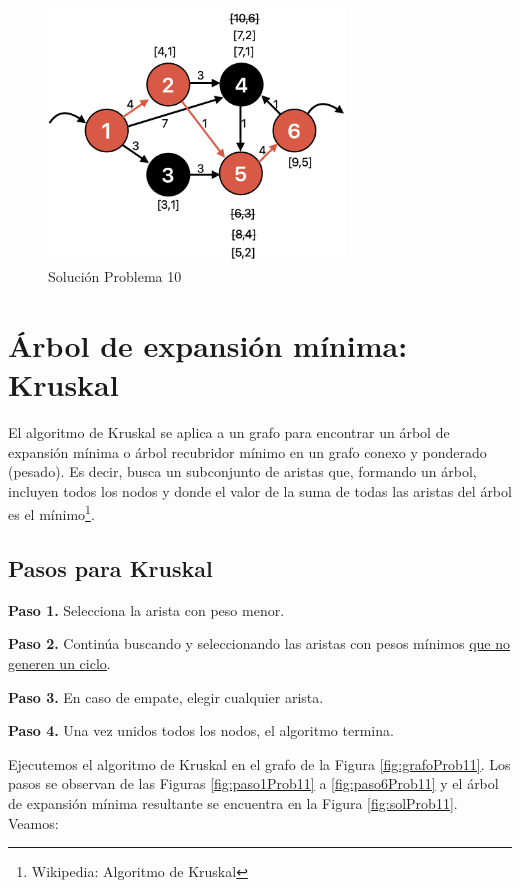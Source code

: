 \documentclass[12pt]{article}  %
\begin{document}
\begin{figure}[H]
\centering
\caption{Solución Problema 10}
\label{fig:resProb10}
\includegraphics[width=0.7\textwidth]{assets/solProb10.png}
\end{figure}

\section{Árbol de expansión mínima: Kruskal}
El algoritmo de Kruskal se aplica a un grafo para encontrar un árbol de expansión mínima o árbol recubridor mínimo en un grafo conexo y ponderado (pesado). Es decir, busca un subconjunto de aristas que, formando un árbol, incluyen todos los nodos y donde el valor de la suma de todas las aristas del árbol es el mínimo\footnote{Wikipedia: Algoritmo de Kruskal}.

\subsection{Pasos para Kruskal}
\textbf{Paso 1.} Selecciona la arista con peso menor.

\textbf{Paso 2.} Continúa buscando y seleccionando las aristas con pesos mínimos \underline{que no generen un ciclo}.

\textbf{Paso 3.} En caso de empate, elegir cualquier arista.

\textbf{Paso 4.} Una vez unidos todos los nodos, el algoritmo termina.

Ejecutemos el algoritmo de Kruskal en el grafo de la Figura \ref{fig:grafoProb11}. Los pasos se observan de las Figuras \ref{fig:paso1Prob11} a \ref{fig:paso6Prob11} y el árbol de expansión mínima resultante se encuentra en la Figura \ref{fig:solProb11}. Veamos:
\end{document}
